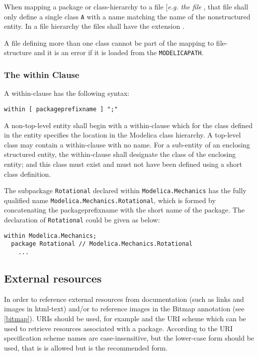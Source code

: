 When mapping a package or class-hierarchy to a file {[}\emph{e.g. the
  file} \filename{A.mo}{]}, that file shall only define a single class \lstinline!A! with a
name matching the name of the nonstructured entity. In a file hierarchy
the files shall have the extension .

A  file defining more than one class cannot be part of the mapping
to file-structure and it is an error if it is loaded from the
\lstinline!MODELICAPATH!.

\subsubsection{The within Clause}

A within-clause has the following syntax:

\begin{lstlisting}[language=grammar]
  within [ packageprefixname ] ";"
\end{lstlisting}
  A non-top-level entity shall begin with a within-clause which for the
  class defined in the entity specifies the location in the Modelica class
    hierarchy. A top-level class may contain a within-clause with no name.
    For a sub-entity of an enclosing structured entity, the within-clause
shall designate the class of the enclosing entity; and this class must
exist and must not have been defined using a short class definition.

\begin{example}
The subpackage \lstinline!Rotational! declared within
\lstinline!Modelica.Mechanics! has the fully qualified name
\lstinline!Modelica.Mechanics.Rotational!, which is formed by concatenating
the packageprefixname with the short name of the package. The
declaration of \lstinline!Rotational! could be given as below:
\begin{lstlisting}[language=modelica]
  within Modelica.Mechanics;
  package Rotational // Modelica.Mechanics.Rotational
    ...
\end{lstlisting}
\end{example}

\subsection{External resources}

In order to reference external resources from documentation (such as
links and images in html-text) and/or to reference images in the Bitmap
annotation (see \autoref{bitmap}). URIs should be used, for example
 and the URI scheme  which can be used to retrieve
resources associated with a package. According to the URI specification scheme names are
case-insensitive, but the lower-case form should be used, that is  is allowed but  is the
recommended form.

